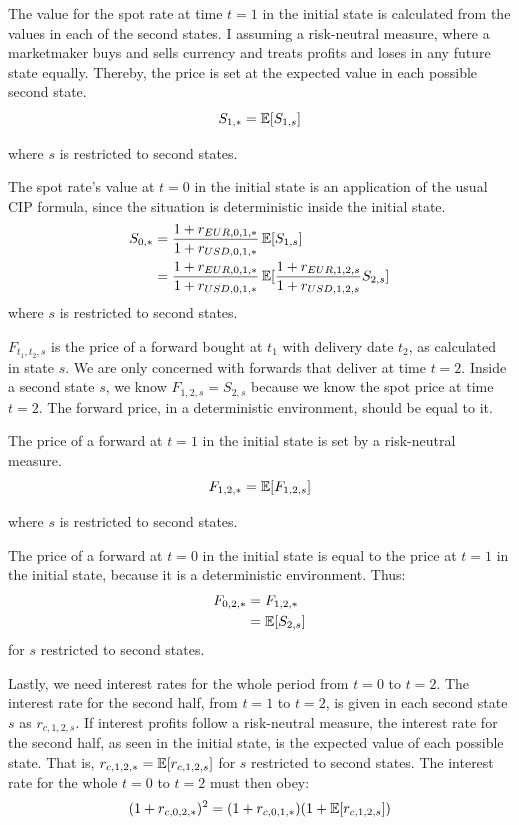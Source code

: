 The value for the spot rate at time $t=1$ in the initial state is calculated from the values in each of the second states.  I assuming a risk-neutral measure, where a marketmaker buys and sells currency and treats profits and loses in any future state equally.  Thereby, the price is set at the expected value in each possible second state.
\begin{equation}
  S_{1,*} = \operatorname{\mathbb{E}}[S_{1,s}]
\end{equation}

\noindent where $s$ is restricted to second states.

The spot rate's value at $t=0$ in the initial state is an application of the usual CIP formula, since the situation is deterministic inside the initial state.
\begin{align}
  S_{0,*} &= \frac{1+r_{EUR,0,1,*}}{1 + r_{USD,0,1,*}}\operatorname{\mathbb{E}}[S_{1,s}]  \\
           &= \frac{1+r_{EUR,0,1,*}}{1 + r_{USD,0,1,*}}\operatorname{\mathbb{E}}[\frac{1+r_{EUR,1,2,s}}{1 + r_{USD,1,2,s}} S_{2,s}]
\end{align}
\noindent where $s$ is restricted to second states.

$F_{t_1,t_2,s}$ is the price of a forward bought at $t_1$ with delivery date $t_2$, as calculated in state $s$.  We are only concerned with forwards that deliver at time $t=2$.  Inside a second state $s$, we know $F_{1,2,s} = S_{2,s}$ because we know the spot price at time $t=2$.  The forward price, in a deterministic environment, should be equal to it.

The price of a forward at $t=1$ in the initial state is set by a risk-neutral measure. 
\begin{equation}
  F_{1,2,*} = \operatorname{\mathbb{E}}[F_{1,2,s}]
\end{equation}

\noindent where $s$ is restricted to second states.

The price of a forward at $t=0$ in the initial state is equal to the price at $t=1$ in the initial state, because it is a deterministic environment.  Thus:
\begin{align}
  F_{0,2,*} &= F_{1,2,*} \\
                &= \operatorname{\mathbb{E}}[S_{2,s}]
\end{align}
\noindent for $s$ restricted to second states. 

Lastly, we need interest rates for the whole period from $t=0$ to $t=2$.  The interest rate for the second half, from $t=1$ to $t=2$, is given in each second state $s$ as $r_{c,1,2,s}$.  If interest profits follow a risk-neutral measure, the interest rate for the second half, as seen in the initial state, is the expected value of each possible state.  That is, $r_{c,1,2,*} = \operatorname{\mathbb{E}}[r_{c,1,2,s}]$ for $s$ restricted to second states.  The interest rate for the whole $t=0$ to $t=2$ must then obey:
\begin{equation}
  (1 + r_{c,0,2,*})^2 = (1 + r_{c,0,1,*})(1 + \operatorname{\mathbb{E}}[r_{c,1,2,s}])
\end{equation}

